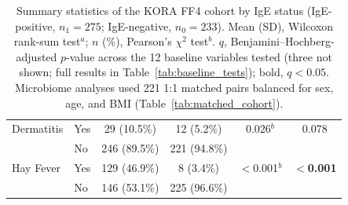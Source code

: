\begin{table}[h!]
\begin{tabular}{llcccc}
Dermatitis & Yes & 29 (10.5\%) & 12 (5.2\%) & 0.026$^{b}$ & 0.078 \\
 & No & 246 (89.5\%) & 221 (94.8\%) &  &  \\

Hay Fever & Yes & 129 (46.9\%) & 8 (3.4\%) & $<$0.001$^{b}$ & \textbf{$<$0.001} \\
 & No & 146 (53.1\%) & 225 (96.6\%) &  &  \\

\end{tabular}
\caption{Summary statistics of the KORA FF4 cohort by IgE status (IgE-positive, $n_1 = 275$; IgE-negative, $n_0 = 233$). Mean (SD), Wilcoxon rank-sum test$^{a}$; $n$ (\%), Pearson's $\chi^2$ test$^{b}$. $q$, Benjamini--Hochberg-adjusted $p$-value across the 12 baseline variables tested (three not shown; full results in Table~\ref{tab:baseline_tests}); bold, $q < 0.05$. Microbiome analyses used 221 1:1 matched pairs balanced for sex, age, and BMI (Table~\ref{tab:matched_cohort}).\label{tab:stats}}
\end{table}
